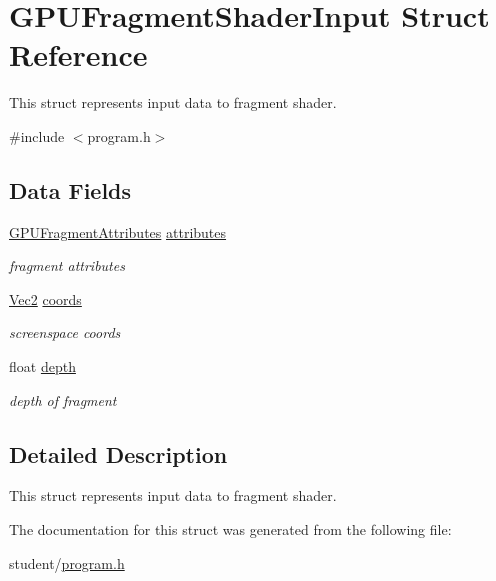 \hypertarget{structGPUFragmentShaderInput}{\section{G\-P\-U\-Fragment\-Shader\-Input Struct Reference}
\label{structGPUFragmentShaderInput}
}


This struct represents input data to fragment shader.  




{\ttfamily \#include $<$program.\-h$>$}

\subsection*{Data Fields}
\begin{DoxyCompactItemize}
\item 
\hypertarget{structGPUFragmentShaderInput_ac222496adf3fb044cebcd79693b8962e}{\hyperlink{structGPUFragmentAttributes}{G\-P\-U\-Fragment\-Attributes} \hyperlink{structGPUFragmentShaderInput_ac222496adf3fb044cebcd79693b8962e}{attributes}}\label{structGPUFragmentShaderInput_ac222496adf3fb044cebcd79693b8962e}

\begin{DoxyCompactList}\small\item\em fragment attributes \end{DoxyCompactList}\item 
\hypertarget{structGPUFragmentShaderInput_a6164fa8964152f4a4feb231926efa368}{\hyperlink{structVec2}{Vec2} \hyperlink{structGPUFragmentShaderInput_a6164fa8964152f4a4feb231926efa368}{coords}}\label{structGPUFragmentShaderInput_a6164fa8964152f4a4feb231926efa368}

\begin{DoxyCompactList}\small\item\em screenspace coords \end{DoxyCompactList}\item 
\hypertarget{structGPUFragmentShaderInput_a634040ee49cce73c9f83ddd4478b36e3}{float \hyperlink{structGPUFragmentShaderInput_a634040ee49cce73c9f83ddd4478b36e3}{depth}}\label{structGPUFragmentShaderInput_a634040ee49cce73c9f83ddd4478b36e3}

\begin{DoxyCompactList}\small\item\em depth of fragment \end{DoxyCompactList}\end{DoxyCompactItemize}


\subsection{Detailed Description}
This struct represents input data to fragment shader. 

The documentation for this struct was generated from the following file\-:\begin{DoxyCompactItemize}
\item 
student/\hyperlink{program_8h}{program.\-h}\end{DoxyCompactItemize}
